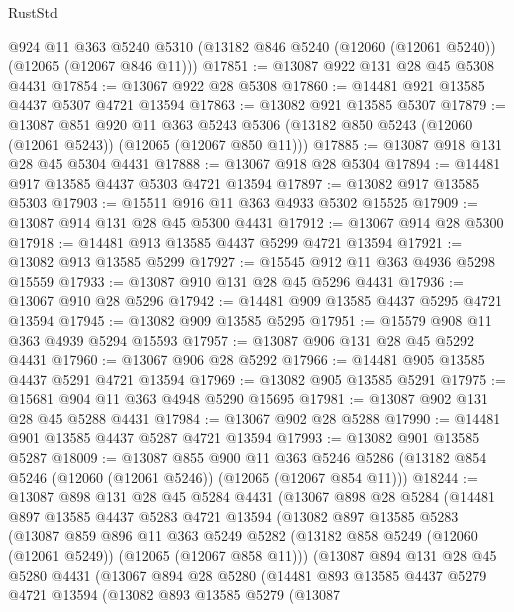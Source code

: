 \begin{lexlean}{RustStd}
\begin{coremodule}
    @924
    @11
    @363
    @5240
    @5310
    (@13182 @846 @5240 (@12060 (@12061 @5240)) (@12065 (@12067 @846 @11)))
@17851 := @13087 @922 @131 @28 @45 @5308 @4431
@17854 := @13067 @922 @28 @5308
@17860 := @14481 @921 @13585 @4437 @5307 @4721 @13594
@17863 := @13082 @921 @13585 @5307
@17879 := @13087
    @851
    @920
    @11
    @363
    @5243
    @5306
    (@13182 @850 @5243 (@12060 (@12061 @5243)) (@12065 (@12067 @850 @11)))
@17885 := @13087 @918 @131 @28 @45 @5304 @4431
@17888 := @13067 @918 @28 @5304
@17894 := @14481 @917 @13585 @4437 @5303 @4721 @13594
@17897 := @13082 @917 @13585 @5303
@17903 := @15511 @916 @11 @363 @4933 @5302 @15525
@17909 := @13087 @914 @131 @28 @45 @5300 @4431
@17912 := @13067 @914 @28 @5300
@17918 := @14481 @913 @13585 @4437 @5299 @4721 @13594
@17921 := @13082 @913 @13585 @5299
@17927 := @15545 @912 @11 @363 @4936 @5298 @15559
@17933 := @13087 @910 @131 @28 @45 @5296 @4431
@17936 := @13067 @910 @28 @5296
@17942 := @14481 @909 @13585 @4437 @5295 @4721 @13594
@17945 := @13082 @909 @13585 @5295
@17951 := @15579 @908 @11 @363 @4939 @5294 @15593
@17957 := @13087 @906 @131 @28 @45 @5292 @4431
@17960 := @13067 @906 @28 @5292
@17966 := @14481 @905 @13585 @4437 @5291 @4721 @13594
@17969 := @13082 @905 @13585 @5291
@17975 := @15681 @904 @11 @363 @4948 @5290 @15695
@17981 := @13087 @902 @131 @28 @45 @5288 @4431
@17984 := @13067 @902 @28 @5288
@17990 := @14481 @901 @13585 @4437 @5287 @4721 @13594
@17993 := @13082 @901 @13585 @5287
@18009 := @13087
    @855
    @900
    @11
    @363
    @5246
    @5286
    (@13182 @854 @5246 (@12060 (@12061 @5246)) (@12065 (@12067 @854 @11)))
@18244 := @13087
    @898
    @131
    @28
    @45
    @5284
    @4431
    (@13067
      @898
      @28
      @5284
      (@14481
        @897
        @13585
        @4437
        @5283
        @4721
        @13594
        (@13082
          @897
          @13585
          @5283
          (@13087
            @859
            @896
            @11
            @363
            @5249
            @5282
            (@13182 @858 @5249 (@12060 (@12061 @5249)) (@12065 (@12067 @858 @11)))
            (@13087
              @894
              @131
              @28
              @45
              @5280
              @4431
              (@13067
                @894
                @28
                @5280
                (@14481
                  @893
                  @13585
                  @4437
                  @5279
                  @4721
                  @13594
                  (@13082
                    @893
                    @13585
                    @5279
                    (@13087

\end{coremodule}
\end{lexlean}
